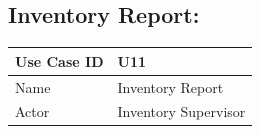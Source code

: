 \documentclass[12pt]{article}
\begin{document}
\subsection{Inventory Report:}

\begin{table}[H]
\begin{tabular}{|l|l|}
\hline
Use Case ID & U11                                                                                                                                                                                                                                                                                                                                                                                                                                                                                                                                                                                                                                                                                                                                                                                                                                                                                      \\ \hline
Name        & Inventory Report                                                                                                                                                                                                                                                                                                                                                                                                                                                                                                                                                                                                                                                                                                                                                                                                                                                                         \\ \hline
Actor       & Inventory Supervisor                                                                                                                                                                                                                                                                                                                                                                                                                                                                                                                                                                                                                                                                                                                                                                                                                                                                     \\ \hline

\end{tabular}
\end{table}
\end{document}
